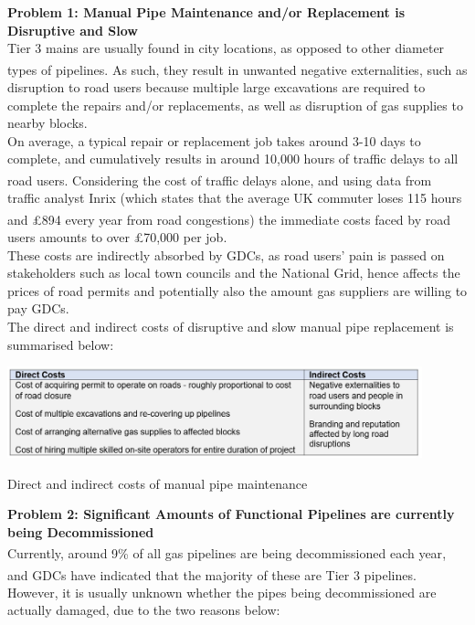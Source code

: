 \documentclass[11pt]{article}		%
\newcommand{\supercite}[1]{\textsuperscript{\cite{#1}}}		%
\begin{document}
    \textbf{Problem 1: Manual Pipe Maintenance and/or Replacement is Disruptive and Slow}\\
    Tier 3 mains are usually found in city locations, as opposed to other diameter types of pipelines\supercite{sönnichsen_5_2021}. As such, they result in unwanted negative externalities, such as disruption to road users because multiple large excavations are required to complete the repairs and/or replacements, as well as disruption of gas supplies to nearby blocks. \\ \hspace*{3ex}
    On average, a typical repair or replacement job takes around 3-10 days to complete, and cumulatively results in around 10,000 hours of traffic delays to all road users\supercite{ltd}. Considering the cost of traffic delays alone, and using data from traffic analyst Inrix (which states that the average UK commuter loses 115 hours and £894 every year from road congestions\supercite{ltd}) the immediate costs faced by road users amounts to over £70,000 per job. \\ \hspace*{3ex}
    These costs are indirectly absorbed by GDCs, as road users’ pain is passed on stakeholders such as local town councils and the National Grid, hence affects the prices of road permits and potentially also the amount gas suppliers are willing to pay GDCs. \\ \hspace*{3ex}
    The direct and indirect costs of disruptive and slow manual pipe replacement is summarised below: 
    	\begin{table}[h]
			\centering
			\includegraphics[width=0.9\textwidth]{costs.jpg}
			\caption{Direct and indirect costs of manual pipe maintenance}
			\label{pipemaintenancecosts}
 		\end{table}
 	\vspace{-0.5cm}
 	
    \textbf{Problem 2: Significant Amounts of Functional Pipelines are currently being Decommissioned}\\
    Currently, around 9\% of all gas pipelines are being decommissioned each year\supercite{ltd}, and GDCs have indicated that the majority of these are Tier 3 pipelines\supercite{ltd}. However, it is usually unknown whether the pipes being decommissioned are actually damaged, due to the two reasons below:
	
\end{document}
